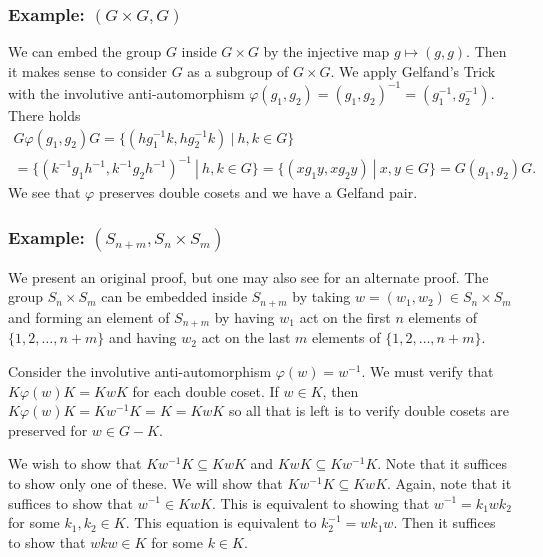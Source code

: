 \documentclass[11pt]{amsart}
\theoremstyle{remark}
\begin{document}
\subsubsection{Example: $(G\times G,G)$}
We can embed the group $G$ inside $G\times G$ by the injective map $g\mapsto (g,g)$.
Then it makes sense to consider $G$ as a subgroup of $G\times G$.
We apply Gelfand's Trick with the involutive anti-automorphism $\varphi(g_1,g_2)=(g_1,g_2)^{-1}=(g_1^{-1},g_2^{-1})$.
There holds
\begin{multline*}
	G\varphi(g_1,g_2)G = \{(hg_1^{-1}k,hg_2^{-1}k)\ |\ h,k\in G\} \\
	= \{(k^{-1}g_1h^{-1},k^{-1}g_2h^{-1})^{-1}\ |\ h,k\in G\} = \{(xg_1y,xg_2y)\ |\ x,y\in G\} = G(g_1,g_2)G.
\end{multline*}
We see that $\varphi$ preserves double cosets and we have a Gelfand pair.


\subsubsection{Example: $(S_{n+m},S_n\times S_m)$}
We present an original proof, but one may also see \cite{Bump13} for an alternate proof.
The group $S_n\times S_m$ can be embedded inside $S_{n+m}$ by taking $w=(w_1,w_2)\in S_n\times S_m$ and forming an element of $S_{n+m}$ by having $w_1$ act on the first $n$ elements of $\{1,2,\ldots,n+m\}$ and having $w_2$ act on the last $m$ elements of $\{1,2,\ldots,n+m\}$.

Consider the involutive anti-automorphism $\varphi(w)=w^{-1}$.
We must verify that $K\varphi(w)K = KwK$ for each double coset.
If $w\in K$, then $K\varphi(w)K=Kw^{-1}K=K=KwK$ so all that is left is to verify double cosets are preserved for $w\in G-K$.

We wish to show that $Kw^{-1}K\subseteq KwK$ and $KwK \subseteq Kw^{-1}K$.
Note that it suffices to show only one of these.
We will show that $Kw^{-1}K\subseteq KwK$.
Again, note that it suffices to show that $w^{-1} \in KwK$.
This is equivalent to showing that $w^{-1} = k_1wk_2$ for some $k_1,k_2\in K$.
This equation is equivalent to $k_2^{-1} = wk_1w$.
Then it suffices to show that $wkw\in K$ for some $k\in K$.
\end{document}
